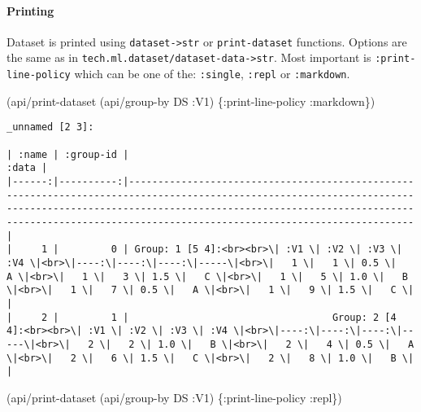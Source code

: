 \documentclass[]{article}
\newenvironment{Shaded}{\begin{snugshade}}{\end{snugshade}}
\newcommand{\AttributeTok}[1]{\textcolor[rgb]{0.77,0.63,0.00}{#1}}
\newcommand{\NormalTok}[1]{#1}
\let\oldparagraph\paragraph
\renewcommand{\paragraph}[1]{\oldparagraph{#1}\mbox{}}
\begin{document}
\paragraph{Printing}\label{printing}

Dataset is printed using \texttt{dataset-\textgreater{}str} or
\texttt{print-dataset} functions. Options are the same as in
\texttt{tech.ml.dataset/dataset-data-\textgreater{}str}. Most important
is \texttt{:print-line-policy} which can be one of the:
\texttt{:single}, \texttt{:repl} or \texttt{:markdown}.

\begin{Shaded}
\begin{Highlighting}[]
\NormalTok{(api/print-dataset (api/group-by DS }\AttributeTok{:V1}\NormalTok{) \{}\AttributeTok{:print-line-policy} \AttributeTok{:markdown}\NormalTok{\})}
\end{Highlighting}
\end{Shaded}

\begin{verbatim}
_unnamed [2 3]:

| :name | :group-id |                                                                                                                                                                                                                                                             :data |
|------:|----------:|-------------------------------------------------------------------------------------------------------------------------------------------------------------------------------------------------------------------------------------------------------------------|
|     1 |         0 | Group: 1 [5 4]:<br><br>\| :V1 \| :V2 \| :V3 \| :V4 \|<br>\|----:\|----:\|----:\|-----\|<br>\|   1 \|   1 \| 0.5 \|   A \|<br>\|   1 \|   3 \| 1.5 \|   C \|<br>\|   1 \|   5 \| 1.0 \|   B \|<br>\|   1 \|   7 \| 0.5 \|   A \|<br>\|   1 \|   9 \| 1.5 \|   C \| |
|     2 |         1 |                                   Group: 2 [4 4]:<br><br>\| :V1 \| :V2 \| :V3 \| :V4 \|<br>\|----:\|----:\|----:\|-----\|<br>\|   2 \|   2 \| 1.0 \|   B \|<br>\|   2 \|   4 \| 0.5 \|   A \|<br>\|   2 \|   6 \| 1.5 \|   C \|<br>\|   2 \|   8 \| 1.0 \|   B \| |
\end{verbatim}

\begin{Shaded}
\begin{Highlighting}[]
\NormalTok{(api/print-dataset (api/group-by DS }\AttributeTok{:V1}\NormalTok{) \{}\AttributeTok{:print-line-policy} \AttributeTok{:repl}\NormalTok{\})}
\end{Highlighting}
\end{Shaded}
\end{document}
